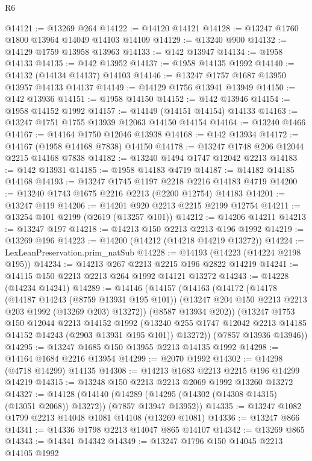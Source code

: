 \begin{lexlean}{R6}
\begin{coremodule}
@14121 := @13269 @264
@14122 := @14120 @14121
@14128 := @13247 @1760 @1800 @13964 @14049 @14103 @14109
@14129 := @13240 @900
@14132 := @14129 @1759 @13958 @13963
@14133 := @142 @13947
@14134 := @1958 @14133
@14135 := @142 @13952
@14137 := @1958 @14135 @1992
@14140 := @14132 (@14134 @14137) @14103
@14146 := @13247 @1757 @1687 @13950 @13957 @14133 @14137
@14149 := @14129 @1756 @13941 @13949
@14150 := @142 @13936
@14151 := @1958 @14150
@14152 := @142 @13946
@14154 := @1958 @14152 @1992
@14157 := @14149 (@14151 @14154) @14133
@14163 := @13247 @1751 @1755 @13939 @12063 @14150 @14154
@14164 := @13240 @1466
@14167 := @14164 @1750 @12046 @13938
@14168 := @142 @13934
@14172 := @14167 (@1958 @14168 @7838) @14150
@14178 := @13247 @1748 @206 @12044 @2215 @14168 @7838
@14182 := @13240 @1494 @1747 @12042 @2213
@14183 := @142 @13931
@14185 := @1958 @14183 @4719
@14187 := @14182 @14185 @14168
@14193 := @13247 @1745 @1197 @2218 @2216 @14183 @4719
@14200 := @13240 @1743 @1675 @2216 @2213 (@2200 @12754) @14183
@14201 := @13247 @119
@14206 := @14201 @920 @2213 @2215 @2199 @12754
@14211 := @13254 @101 @2199 (@2619 (@13257 @101))
@14212 := @14206 @14211
@14213 := @13247 @197
@14218 := @14213 @150 @2213 @2213 @196 @1992
@14219 := @13269 @196
@14223 := @14200 (@14212 (@14218 @14219 @13272))
@14224 := LexLeanPreservation.prim_natSub
@14228 := @14193 (@14223 (@14224 @2198 @195))
@14234 := @14213 @267 @2213 @2215 @196 @2822 @14219
@14241 := @14115 @150 @2213 @2213 @264 @1992 @14121 @13272
@14243 := @14228 (@14234 @14241)
@14289 := @14146
    (@14157
      (@14163
        (@14172
          (@14178
            (@14187 @14243 (@8759 @13931 @195 @101))
            (@13247 @204 @150 @2213 @2213 @203 @1992 (@13269 @203) @13272))
          (@8587 @13934 @202))
        (@13247
          @1753
          @150
          @12044
          @2213
          @14152
          @1992
          (@13240 @255 @1747 @12042 @2213 @14185 @14152 @14243 (@2903 @13931 @195 @101))
          @13272))
      (@7857 @13936 @13946))
@14295 := @13247 @1685 @150 @13955 @2213 @14135 @1992
@14298 := @14164 @1684 @2216 @13954
@14299 := @2070 @1992
@14302 := @14298 (@4718 @14299) @14135
@14308 := @14213 @1683 @2213 @2215 @196 @14299 @14219
@14315 := @13248 @150 @2213 @2213 @2069 @1992 @13260 @13272
@14327 := @14128
    (@14140 (@14289 (@14295 (@14302 (@14308 @14315) (@13051 @2068)) @13272)) (@7857 @13947 @13952))
@14335 := @13247 @1082 @1799 @2213 @14048 @1081 @14108 (@13269 @1081)
@14336 := @13247 @866
@14341 := @14336 @1798 @2213 @14047 @865 @14107
@14342 := @13269 @865
@14343 := @14341 @14342
@14349 := @13247 @1796 @150 @14045 @2213 @14105 @1992

\end{coremodule}
\end{lexlean}
